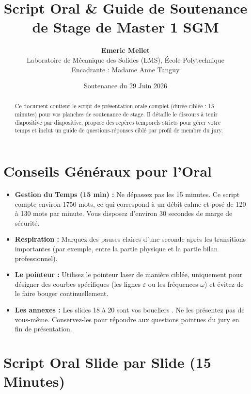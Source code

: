 \documentclass[11pt,a4paper]{article}
\title{\textbf{Script Oral \& Guide de Soutenance \\ de Stage de Master 1 SGM}}
\author{\textbf{Emeric Mellet} \\ Laboratoire de Mécanique des Solides (LMS), École Polytechnique \\ Encadrante : Madame Anne Tanguy}
\date{Soutenance du 29 Juin 2026}
\begin{document}
\maketitle

\begin{abstract}
Ce document contient le script de présentation orale complet (durée ciblée : 15 minutes) pour vos planches de soutenance de stage. Il détaille le discours à tenir diapositive par diapositive, propose des repères temporels stricts pour gérer votre temps et inclut un guide de questions-réponses ciblé par profil de membre du jury.
\end{abstract}

\tableofcontents
\newpage

\section{Conseils Généraux pour l'Oral}
\begin{itemize}[label=\textbullet]
    \item \textbf{Gestion du Temps (15 min) :} Ne dépassez pas les 15 minutes. Ce script compte environ \num{1750} mots, ce qui correspond à un débit calme et posé de \num{120} à \num{130} mots par minute. Vous disposez d'environ \num{30} secondes de marge de sécurité.
    \item \textbf{Respiration :} Marquez des pauses claires d'une seconde après les transitions importantes (par exemple, entre la partie physique et la partie bilan professionnel).
    \item \textbf{Le pointeur :} Utilisez le pointeur laser de manière ciblée, uniquement pour désigner des courbes spécifiques (les lignes $\varepsilon$ ou les fréquences $\omega$) et évitez de le faire bouger continuellement.
    \item \textbf{Les annexes :} Les slides 18 à 20 sont vos \og  boucliers \fg{}. Ne les présentez pas de vous-même. Conservez-les pour répondre aux questions pointues du jury en fin de présentation.
\end{itemize}

\newpage

\section{Script Oral Slide par Slide (15 Minutes)}
\end{document}
